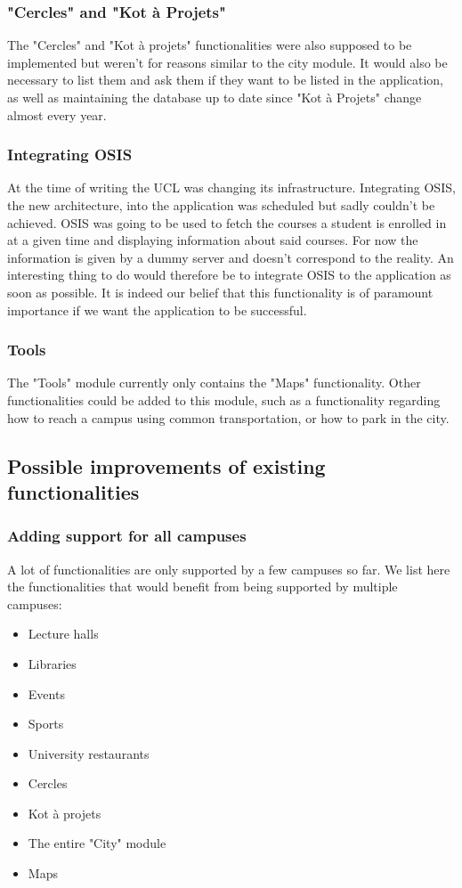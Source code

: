 \documentclass[11pt, a4paper]{report}
\begin{document}
\subsubsection{"Cercles" and "Kot à Projets"}
The "Cercles" and "Kot à projets" functionalities were also supposed to be implemented but weren't for reasons similar to the city module. It would also be necessary to list them and ask them if they want to be listed in the application, as well as maintaining the database up to date since "Kot à Projets" change almost every year.
\subsubsection{Integrating OSIS}
At the time  of writing the UCL was changing its infrastructure. Integrating OSIS, the new architecture, into the application was scheduled but sadly couldn't be achieved. OSIS was going to be used to fetch the courses a student is enrolled in at a given time and displaying information about said courses. 
For now the information is given by a dummy server and doesn't correspond to the reality. An interesting thing to do would therefore be to integrate OSIS to the application as soon as possible.  It is indeed our belief that this functionality is of paramount importance if we want the application to be successful. 
\subsubsection{Tools}
The "Tools" module currently only contains the "Maps" functionality. Other functionalities could be added to this module, such as a functionality regarding how to reach a campus using common transportation, or how to park in the city.
\subsection{Possible improvements of existing functionalities}
\subsubsection{Adding support for all campuses}
A lot of functionalities are only supported by a few campuses so far. We list here the functionalities that would benefit from being supported by multiple campuses:
\begin{itemize}
\item Lecture halls
\item Libraries
\item Events
\item Sports
\item University restaurants
\item Cercles
\item Kot à projets
\item The entire "City" module
\item Maps
\end{itemize}
\end{document}
